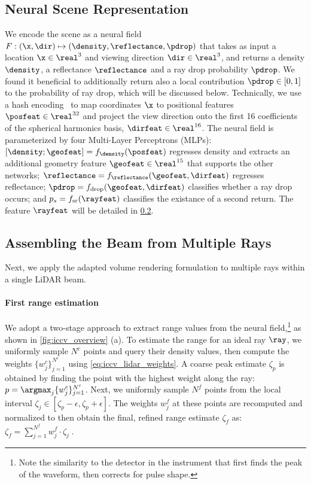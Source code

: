 \subsection{Neural Scene Representation}\label{sec:neural_scene_rep}
We encode the scene as a neural field $F: (\x, \dir) \mapsto (\density, \reflectance, \pdrop)$ that takes as input a location $\x \in \real^3$ and viewing direction $\dir \in \real^3$, and returns a density $\density$, a reflectance $\reflectance$ and a ray drop probability $\pdrop$. We found it beneficial to additionally return also a local contribution $\pdrop \in [0, 1]$ to the probability of ray drop, which will be discussed below.
Technically, we use a hash encoding~\cite{mueller2022instant} to map coordinates $\x$ to positional features $\posfeat \in \real^{32}$ and project the view direction onto the first 16 coefficients of the spherical harmonics basis, $\dirfeat \in \real^{16}$. The neural field is parameterized by four Multi-Layer Perceptrons (MLPs): $[\density; \geofeat] = f_\density(\posfeat)$ regresses density and extracts an additional geometry feature $\geofeat \in \real^{15}$ that supports the other networks; $\reflectance = f_{\reflectance}(\geofeat, \dirfeat)$ regresses reflectance; $\pdrop = f_{\text{drop}}(\geofeat, \dirfeat)$ classifies whether a ray drop occurs; and  $p_s = f_{\text{sr}}(\rayfeat)$ classifies the existance of a second return. The feature $\rayfeat$ will be detailed in \cref{sec:render_lidar}.





\subsection{Assembling the Beam from Multiple Rays}
\label{sec:render_lidar}
Next, we apply the adapted volume rendering formulation to multiple rays within a single LiDAR beam.


\paragraph{First range estimation}
We adopt a two-stage approach to extract range values from the neural field,\footnote{Note the similarity to the detector in the instrument that first finds the peak of the waveform, then corrects for pulse shape.} as shown in \cref{fig:iccv_overview} (a).
To estimate the range for an ideal ray $\ray$, we uniformly sample $N^c$ points and query their density values, then compute the weights $\{w^c_j\}_{j=1}^{N^c}$ using \cref{eq:iccv_lidar_weights}. A coarse peak estimate $\zeta_p$ is obtained by finding the point with the highest weight along the ray: $p = \argmax_j \{w^c_j\}_{j=1}^{N^c} $. Next, we uniformly sample $N^f$ points from the local interval $\zeta_j \in [\zeta_p - \epsilon, \zeta_p + \epsilon]$. The weights $w_j^f$ at these points are recomputed and normalized to then obtain the final, refined range estimate $\zeta_f$ as:~$\zeta_f = \sum_{j=1}^{N^f} w^f_j \cdot \zeta_j\;.$



